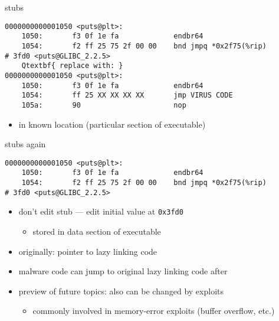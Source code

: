 
\begin{frame}[fragile,label=stubReplace]{stubs}
\begin{Verbatim}[commandchars=Q\{\},fontsize=\fontsize{8}{9}\selectfont]
0000000000001050 <puts@plt>:
    1050:       f3 0f 1e fa             endbr64 
    1054:       f2 ff 25 75 2f 00 00    bnd jmpq *0x2f75(%rip)        # 3fd0 <puts@GLIBC_2.2.5>
    Qtextbf{ replace with: }
0000000000001050 <puts@plt>:
    1050:       f3 0f 1e fa             endbr64 
    1054:       ff 25 XX XX XX XX       jmp VIRUS CODE
    105a:       90                      nop
\end{Verbatim}
\begin{itemize}
    \item in known location (particular section of executable)
\end{itemize}
\end{frame}

\begin{frame}[fragile,label=stubsReplacePtr]{stubs again}
\begin{Verbatim}[commandchars=Q\{\},fontsize=\fontsize{8}{9}\selectfont]
0000000000001050 <puts@plt>:
    1050:       f3 0f 1e fa             endbr64 
    1054:       f2 ff 25 75 2f 00 00    bnd jmpq *0x2f75(%rip)        # 3fd0 <puts@GLIBC_2.2.5>
\end{Verbatim}
\begin{itemize}
\item don't edit stub --- edit initial value at {\tt 0x3fd0}
    \begin{itemize}
    \item stored in data section of executable
    \end{itemize}
\item originally: pointer to lazy linking code
\vspace{.5cm}
\item malware code can jump to original lazy linking code after
\vspace{.5cm}
\item preview of future topics: also can be changed by exploits
    \begin{itemize}
    \item commonly involved in memory-error exploits (buffer overflow, etc.)
    \end{itemize}
\end{itemize}
\end{frame}

